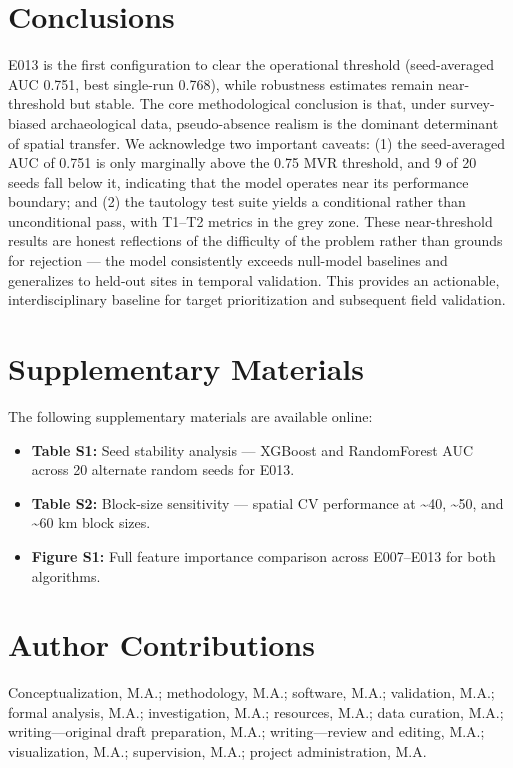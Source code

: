 \documentclass[12pt]{article}
\begin{document}
\section{Conclusions}

E013 is the first configuration to clear the operational threshold (seed-averaged AUC 0.751, best single-run 0.768), while robustness estimates remain near-threshold but stable.
The core methodological conclusion is that, under survey-biased archaeological data, pseudo-absence realism is the dominant determinant of spatial transfer.
We acknowledge two important caveats: (1) the seed-averaged AUC of 0.751 is only marginally above the 0.75 MVR threshold, and 9 of 20 seeds fall below it, indicating that the model operates near its performance boundary; and (2) the tautology test suite yields a conditional rather than unconditional pass, with T1--T2 metrics in the grey zone. These near-threshold results are honest reflections of the difficulty of the problem rather than grounds for rejection --- the model consistently exceeds null-model baselines and generalizes to held-out sites in temporal validation.
This provides an actionable, interdisciplinary baseline for target prioritization and subsequent field validation.

\section*{Supplementary Materials}

The following supplementary materials are available online:
\begin{itemize}
  \item \textbf{Table S1:} Seed stability analysis --- XGBoost and RandomForest AUC across 20 alternate random seeds for E013.
  \item \textbf{Table S2:} Block-size sensitivity --- spatial CV performance at \textasciitilde{}40, \textasciitilde{}50, and \textasciitilde{}60 km block sizes.
  \item \textbf{Figure S1:} Full feature importance comparison across E007--E013 for both algorithms.
\end{itemize}

\section*{Author Contributions}

Conceptualization, M.A.; methodology, M.A.; software, M.A.; validation, M.A.; formal analysis, M.A.; investigation, M.A.; resources, M.A.; data curation, M.A.; writing---original draft preparation, M.A.; writing---review and editing, M.A.; visualization, M.A.; supervision, M.A.; project administration, M.A.
\end{document}
